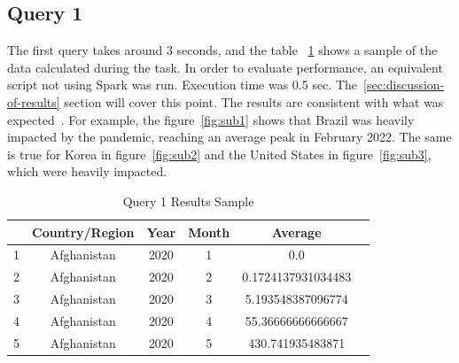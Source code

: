 \documentclass[12pt,oneside]{book} %
\begin{document}
\subsection{Query 1}

The first query takes around 3 seconds, and the table
~\ref{tab:query1-results-sample} shows a sample of the data calculated during
the task. In order to evaluate performance, an equivalent script not using
Spark was run. Execution time was 0.5 sec. The~\ref{sec:discussion-of-results}
section will cover this point. The results are consistent with what was
expected~\cite{NYT}. For example, the figure~\ref{fig:sub1} shows that Brazil
was heavily impacted by the pandemic, reaching an average peak in February
2022. The same is true for Korea in figure~\ref{fig:sub2} and the United States
in figure~\ref{fig:sub3}, which were heavily impacted.

\begin{table}[h]
    \centering
    \captionsetup{font=large}
    \caption{Query 1 Results Sample}
    \normalsize
    \begin{tabular}{|l|c|c|c|c|c|}
        \hline
          & Country/Region & Year & Month & Average            \\
        \hline
        1 & Afghanistan    & 2020 & 1     & 0.0                \\
        2 & Afghanistan    & 2020 & 2     & 0.1724137931034483 \\
        3 & Afghanistan    & 2020 & 3     & 5.193548387096774  \\
        4 & Afghanistan    & 2020 & 4     & 55.36666666666667  \\
        5 & Afghanistan    & 2020 & 5     & 430.741935483871   \\
        \hline
    \end{tabular}\label{tab:query1-results-sample}
\end{table}
\end{document}
